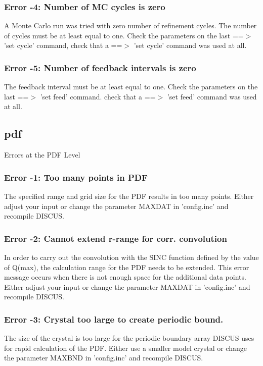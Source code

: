 \subsubsection{Error -4: Number of MC cycles is zero}
\par
A Monte Carlo run was tried with zero number of refinement cycles. 
The number of cycles must be at least equal to one. 
Check the parameters on the last ==$> $ 'set cycle' command, 
check that a ==$> $ 'set cycle' command was used at all. 
\subsubsection{Error -5: Number of feedback intervals is zero}
\par
The feedback interval must be at least equal to one. 
Check the parameters on the last ==$> $ 'set feed' command. 
check that a ==$> $ 'set feed' command was used at all. 
\subsection*{pdf}
Errors at the PDF Level 
\par
\subsubsection{Error -1: Too many points in PDF}
\par
The specified range and grid size for the PDF results in too many 
points. Either adjust your input or change the parameter MAXDAT 
in 'config.inc' and recompile DISCUS. 
\subsubsection{Error -2: Cannot extend r-range for corr. convolution}
\par
In order to carry out the convolution with the SINC function defined 
by the value of Q(max), the calculation range for the PDF needs to 
be extended. This error message occurs when there is not enough 
space for the additional data points. Either adjust your input or 
change the parameter MAXDAT in 'config.inc' and recompile DISCUS. 
\subsubsection{Error -3: Crystal too large to create periodic bound.}
\par
The size of the crystal is too large for the periodic boundary array 
DISCUS uses for rapid calculation of the PDF. Either use a smaller 
model crystal or change the parameter MAXBND in 'config.inc' and 
recompile DISCUS. 
